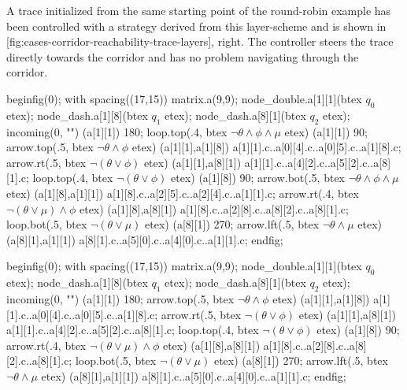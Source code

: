     A trace initialized from the same starting point of the round-robin example has been controlled with a strategy derived from this layer-scheme and is shown in [fig:cases-corridor-reachability-trace-layers], right.
    The controller steers the trace directly towards the corridor and has no problem navigating through the corridor.

\stopsubsection


    beginfig(0);
        with spacing((17,15)) matrix.a(9,9);
        node_double.a[1][1](btex $q_0$ etex);
        node_dash.a[1][8](btex $q_1$ etex);
        node_dash.a[8][1](btex $q_2$ etex);
        incoming(0, "") (a[1][1]) 180;
        loop.top(.4, btex \small \;$ \neg \theta \wedge \phi \wedge \mu$ etex) (a[1][1]) 90;
        arrow.top(.5, btex \small $ \neg \theta \wedge \phi $ etex) (a[1][1],a[1][8]) a[1][1].c..a[0][4].c..a[0][5].c..a[1][8].c;
        arrow.rt(.5, btex \small $ \neg (\theta \vee \phi)$ etex) (a[1][1],a[8][1]) a[1][1].c..a[4][2].c..a[5][2].c..a[8][1].c;
        loop.top(.4, btex \small \;$ \neg (\theta \vee \phi) $ etex) (a[1][8]) 90;
        arrow.bot(.5, btex \small $ \neg \theta \wedge \phi \wedge \mu $ etex) (a[1][8],a[1][1]) a[1][8].c..a[2][5].c..a[2][4].c..a[1][1].c;
        arrow.rt(.4, btex \small \qquad$ \neg (\theta \vee \mu) \wedge \phi $ etex) (a[1][8],a[8][1]) a[1][8].c..a[2][8].c..a[8][2].c..a[8][1].c;
        loop.bot(.5, btex \small \;$ \neg (\theta \vee \mu) $ etex) (a[8][1]) 270;
        arrow.lft(.5, btex \small $ \neg \theta \wedge \mu $ etex) (a[8][1],a[1][1]) a[8][1].c..a[5][0].c..a[4][0].c..a[1][1].c;
    endfig;
\stopreusableMPgraphic

    beginfig(0);
        with spacing((17,15)) matrix.a(9,9);
        node_double.a[1][1](btex $q_0$ etex);
        node_dash.a[1][8](btex $q_1$ etex);
        node_dash.a[8][1](btex $q_2$ etex);
        incoming(0, "") (a[1][1]) 180;
        arrow.top(.5, btex \small $ \neg \theta \wedge \phi $ etex) (a[1][1],a[1][8]) a[1][1].c..a[0][4].c..a[0][5].c..a[1][8].c;
        arrow.rt(.5, btex \small $ \neg (\theta \vee \phi)$ etex) (a[1][1],a[8][1]) a[1][1].c..a[4][2].c..a[5][2].c..a[8][1].c;
        loop.top(.4, btex \small \;$ \neg (\theta \vee \phi) $ etex) (a[1][8]) 90;
        arrow.rt(.4, btex \small \qquad$ \neg (\theta \vee \mu) \wedge \phi $ etex) (a[1][8],a[8][1]) a[1][8].c..a[2][8].c..a[8][2].c..a[8][1].c;
        loop.bot(.5, btex \small \;$ \neg (\theta \vee \mu) $ etex) (a[8][1]) 270;
        arrow.lft(.5, btex \small $ \neg \theta \wedge \mu $ etex) (a[8][1],a[1][1]) a[8][1].c..a[5][0].c..a[4][0].c..a[1][1].c;
    endfig;
\stopreusableMPgraphic

